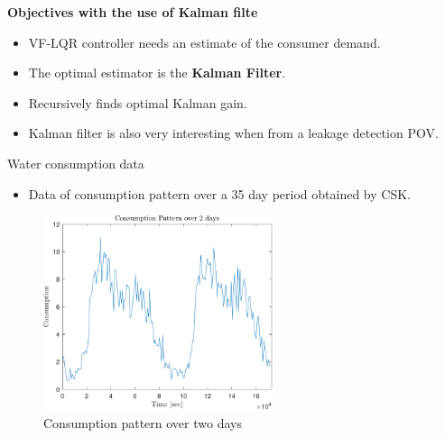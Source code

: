 \begin{frame}
 \textbf{Objectives with the use of Kalman filte}
 \begin{itemize}
 	\item VF-LQR controller needs an estimate of the consumer demand.
 	\item The optimal estimator is the \textbf{Kalman Filter}.
 	\item Recursively finds optimal Kalman gain.
 	\item Kalman filter is also very interesting when from a leakage detection POV.  
 \end{itemize}
\end{frame}

	\begin{frame}{Water consumption data}
		\begin{itemize}
			\item Data of consumption pattern over a 35 day period obtained by CSK.  
		\end{itemize}
			 \begin{figure}[h!]
			\centering
			\includegraphics[width=0.6\textwidth]{Topics/KalmanEstimator/Graphics/ConsumptionPattern.pdf}
			\caption{Consumption pattern over two days}
			\label{fig:Consumption_Pattern}
		\end{figure}
	\end{frame}
	
